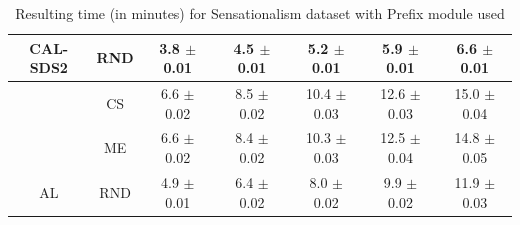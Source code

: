 \begin{table}[htbp]
\begin{tabular*}{\linewidth}{c|c|@{\extracolsep{\fill}}ccccc}
\multirow{-3}{*}{\raggedright\arraybackslash CAL-SDS2} & RND & 3.8 $\pm$ {\small 0.01} & 4.5 $\pm$ {\small 0.01} & 5.2 $\pm$ {\small 0.01} & 5.9 $\pm$ {\small 0.01} & 6.6 $\pm$ {\small 0.01}\\
\midrule
 & CS & 6.6 $\pm$ {\small 0.02} & 8.5 $\pm$ {\small 0.02} & 10.4 $\pm$ {\small 0.03} & 12.6 $\pm$ {\small 0.03} & 15.0 $\pm$ {\small 0.04}\\

 & ME & 6.6 $\pm$ {\small 0.02} & 8.4 $\pm$ {\small 0.02} & 10.3 $\pm$ {\small 0.03} & 12.5 $\pm$ {\small 0.04} & 14.8 $\pm$ {\small 0.05}\\

\multirow{-3}{*}{\raggedright\arraybackslash AL} & RND & 4.9 $\pm$ {\small 0.01} & 6.4 $\pm$ {\small 0.02} & 8.0 $\pm$ {\small 0.02} & 9.9 $\pm$ {\small 0.02} & 11.9 $\pm$ {\small 0.03}\\
\bottomrule
\end{tabular*}
\caption{Resulting time (in minutes) for Sensationalism dataset with Prefix module used}
\label{tab:time_full_sensation_10_prefix}
\end{table}
